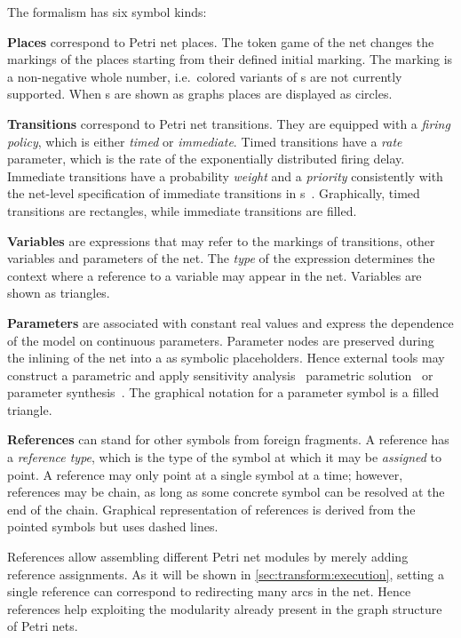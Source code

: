 The  formalism has six symbol kinds:

\newpara\textbf{Places} correspond to Petri net places. The token game of the net changes the markings of the places starting from their defined initial marking. The marking is a non-negative whole number, i.e.~colored variants of s are not currently supported. When s are shown as graphs places are displayed as circles.

\newpara \textbf{Transitions} correspond to Petri net transitions. They are equipped with a \emph{firing policy}, which is either \emph{timed} or \emph{immediate}. Timed transitions have a \emph{rate} parameter, which is the rate of the exponentially distributed firing delay. Immediate transitions have a probability \emph{weight} and a \emph{priority} consistently with the net-level specification of immediate transitions in s~\citep{Teruel03netlevel}. Graphically, timed transitions are rectangles, while immediate transitions are filled.

\newpara \textbf{Variables} are expressions that may refer to the markings of transitions, other variables and parameters of the net. The \emph{type} of the expression determines the context where a reference to a variable may appear in the net. Variables are shown as triangles.

\newpara \textbf{Parameters} are associated with constant real values and express the dependence of the model on continuous parameters. Parameter nodes are preserved during the inlining of the net into a  as symbolic placeholders. Hence external tools may construct a parametric  and apply sensitivity analysis~\citep{Blake88sensitivity} parametric solution~\citep{Hahn11parametric,Voros17pdn} or parameter synthesis~\citep{Quatmann16mdp}. The graphical notation for a parameter symbol is a filled triangle.

\newpara \textbf{References} can stand for other symbols from foreign  fragments. A reference has a \emph{reference type}, which is the type of the symbol at which it may be \emph{assigned} to point. A reference may only point at a single symbol at a time; however, references may be chain, as long as some concrete symbol can be resolved at the end of the chain. Graphical representation of references is derived from the pointed symbols but uses dashed lines.

References allow assembling different Petri net modules by merely adding reference assignments. As it will be shown in \vref{sec:transform:execution}, setting a single reference can correspond to redirecting many arcs in the net. Hence references help exploiting the modularity already present in the graph structure of Petri nets.

